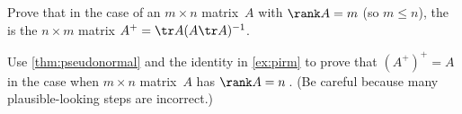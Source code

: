 \begin{exercise} \label{ex:pirm} 
Prove that in the case of an \(m\times n\) matrix~\(A\) with \(\rank A=m\) (so \(m\leq n\)), the  is the \(n\times m\) matrix \(A^+=\tr A(A\tr A)^{-1}\).
\end{exercise}





\begin{exercise}  
Use \cref{thm:pseudonormal} and the identity in \cref{ex:pirm} to prove that \((A^+)^+=A\) in the case when \(m\times n\) matrix~\(A\) has \(\rank A=n\)\,.
(Be careful because many plausible-looking steps are incorrect.)
\end{exercise}

